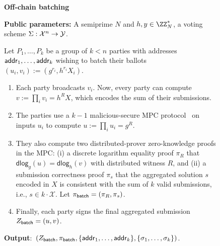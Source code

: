 \begin{figure}
    \centering
    \begin{mdframed}
    \begin{center}
        \textbf{Off-chain batching}
    \end{center}
    \smallskip
    \textbf{Public parameters:} A semiprime $N$ and $h, y \in \ZZ_N^*$, a voting scheme $\Sigma : \mathcal{X}^n \rightarrow \mathcal{Y}$.\hfill\\\medskip

    Let $P_1, \dots, P_{k}$ be a group of $k < n$ parties with addresses ${\sf addr}_1, \dots, {\sf addr}_{k}$ wishing to batch their ballots $(u_i, v_i) := (g^{r_i}, h^{r_i} X_i)$.
    \begin{enumerate}
        \item Each party broadcasts $v_i$. Now, every party can compute $v := \prod_i v_i = h^R X$, which encodes the sum of their submissions.
        \item The parties use a $k-1$ malicious-secure MPC protocol~\cite{ESORICS:DKLPSS13,CCS:Keller20} on inputs $u_i$ to compute $u := \prod_i u_i = g^R$.
        \item They also compute two distributed-prover zero-knowledge proofs \cite{PoPETS:DPPSV22} in the MPC: (i) a discrete logarithm equality proof $\pi_R$ that $\mathsf{dlog}_g(u) = \mathsf{dlog}_h(v)$ with distributed witness $R$, and (ii) a submission correctness proof $\pi_s$ that the aggregated solution $s$ encoded in $X$ is consistent with the sum of $k$ valid submissions, i.e., $s\in k \cdot \mathcal{X}$. Let $\pi_{\sf batch} = (\pi_R, \pi_s)$.
        \item Finally, each party signs the final aggregated submission $Z_{\sf batch} = (u,v)$.
    \end{enumerate}
    \textbf{Output}:~$(Z_{\sf batch},\pi_{\sf batch}, \{{\sf addr}_1, \dots, {\sf addr}_{k}\}, \{\sigma_1, \dots, \sigma_{k}\})$.
    

\end{mdframed}
\end{figure}
